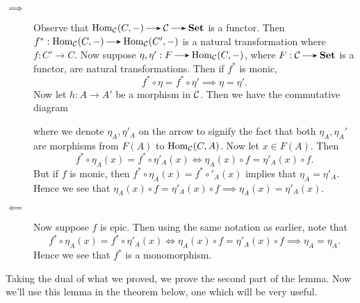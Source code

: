     \begin{prf}
        \begin{description}
            \item[$\bm{\implies}$] Observe that $\hom_{\cc}(C, -) \to
            \cc \to \textbf{Set}$ is a functor. Then $f^*:
            \hom_{\cc}(C, -) \to \hom_{\cc}(C', -)$ is a natural transformation where
            $f: C' \to C$. Now suppose $\eta, \eta': F
            \to \hom_{\cc}(C, -)$, where $F: \cc \to \textbf{Set}$ is a functor, are
            natural transformations. Then if $f^*$ is monic, 
            \[  
                f^* \circ \eta = f^* \circ \eta' \implies \eta = \eta'.
            \]
            Now let $h: A \to A'$ be a morphism in $\mathcal{C}$. Then we have the
            commutative diagram 
            \begin{center}
                \hspace{1cm}
            \end{center}
            where we denote $\eta_A, \eta'_{A}$ on the arrow to
            signify the fact that both $\eta_A, \eta_A'$ are morphisms
            from $F(A)$ to $\operatorname{\mathrm{Hom}}_{\mathcal{C}}(C, A)$. Now 
            let $x \in F(A)$. Then
            \[
                f^* \circ \eta_A(x) = f^* \circ \eta'_A(x) \iff \eta_A(x) \circ f = \eta'_A(x) \circ f.
            \]
            But if $f$ is monic, then $f^* \circ \eta_A(x) = f^*
            \circ'_A(x)$ implies that $\eta_A = \eta'_A$. Hence
            we see that $\eta_A(x) \circ f = \eta'_A(x) \circ f
            \implies \eta_A(x) = \eta'_A(x).$

            \item[$\bm{\impliedby}$] Now suppose $f$ is epic. Then
            using the same notation as earlier, note that 
            \[
                f^* \circ \eta_A(x) = f^* \circ \eta'_A(x) \iff \eta_A(x) \circ f = \eta'_A(x) \circ f \implies \eta_{A} = \eta_{A}.
            \]
            Hence we see that $f^*$ is a monomorphism. 
        \end{description}
    \end{prf}
    Taking the dual of what we proved, we prove the second part of the
    lemma. Now we'll use this lemma in the theorem below, one which will be very useful.

